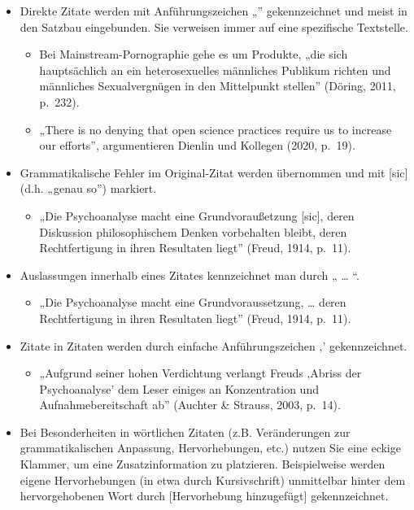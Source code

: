 \documentclass[
  letterpaper,
  DIV=11]{scrreprt}
\providecommand{\tightlist}{%
  \setlength{\itemsep}{0pt}\setlength{\parskip}{0pt}}\usepackage{longtable,booktabs,array}
\begin{document}
\begin{itemize}
\item
  Direkte Zitate werden mit Anführungszeichen „'' gekennzeichnet und
  meist in den Satzbau eingebunden. Sie verweisen immer auf eine
  spezifische Textstelle.

  \begin{itemize}
  \item
    Bei Mainstream-Pornographie gehe es um Produkte, „die sich
    hauptsächlich an ein heterosexuelles männliches Publikum richten und
    männliches Sexualvergnügen in den Mittelpunkt stellen'' (Döring,
    2011, p.~232).
  \item
    „There is no denying that open science practices require us to
    increase our efforts'', argumentieren Dienlin und Kollegen (2020,
    p.~19).
  \end{itemize}
\item
  Grammatikalische Fehler im Original-Zitat werden übernommen und mit
  {[}sic{]} (d.h. „genau so'') markiert.

  \begin{itemize}
  \tightlist
  \item
    „Die Psychoanalyse macht eine Grundvoraußetzung {[}sic{]}, deren
    Diskussion philosophischem Denken vorbehalten bleibt, deren
    Rechtfertigung in ihren Resultaten liegt'' (Freud, 1914, p.~11).
  \end{itemize}
\item
  Auslassungen innerhalb eines Zitates kennzeichnet man durch „ \ldots{}
  ``.

  \begin{itemize}
  \tightlist
  \item
    „Die Psychoanalyse macht eine Grundvoraussetzung, \ldots{} deren
    Rechtfertigung in ihren Resultaten liegt'' (Freud, 1914, p.~11).
  \end{itemize}
\item
  Zitate in Zitaten werden durch einfache Anführungszeichen ‚'
  gekennzeichnet.

  \begin{itemize}
  \tightlist
  \item
    „Aufgrund seiner hohen Verdichtung verlangt Freuds ‚Abriss der
    Psychoanalyse' dem Leser einiges an Konzentration und
    Aufnahmebereitschaft ab'' (Auchter \& Strauss, 2003, p.~14).
  \end{itemize}
\item
  Bei Besonderheiten in wörtlichen Zitaten (z.B. Veränderungen zur
  grammatikalischen Anpassung, Hervorhebungen, etc.) nutzen Sie eine
  eckige Klammer, um eine Zusatzinformation zu platzieren. Beispielweise
  werden eigene Hervorhebungen (in etwa durch Kursivschrift) unmittelbar
  hinter dem hervorgehobenen Wort durch {[}Hervorhebung hinzugefügt{]}
  gekennzeichnet.


\end{itemize}
\end{document}
